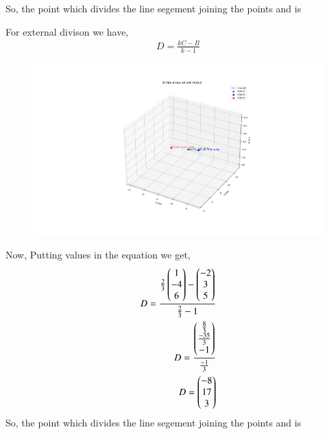 \documentclass[journal]{IEEEtran}
\begin{document}
So, the point which divides the line segement joining the points  and  is 



For external divison we have,
\begin{align}
    D = \frac{kC - B}{k - 1}
\end{align}
 \begin{figure}[hbt!]
		\centering
		\includegraphics[width=0.8\linewidth]{plots/plot2.png}

	\end{figure}
Now, Putting values in the equation we get,
\begin{align}
D = \frac{\frac{2}{3}
 \begin{pmatrix}
   1
   \\
   -4
   \\
   6
 \end{pmatrix}
 -
 \begin{pmatrix}
   -2
   \\
   3 
   \\
   5
 \end{pmatrix}}{\frac{2}{3}-1}
 \\
 D = \frac{
  \begin{pmatrix}
  \frac{8}{3}
  \\
  \frac{-35}{3}
  \\
  -1
  \end{pmatrix}
  }{\frac{-1}{3}}
  \\
D = 
 \begin{pmatrix}
  -8
  \\
  17
  \\
  3
 \end{pmatrix}
 \end{align}
So, the point which divides the line segement joining the points  and  is 
\end{document}
